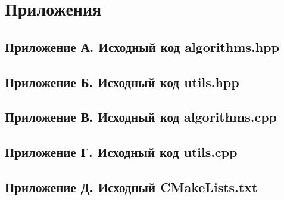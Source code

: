 \newpage

\section*{Приложения}

\subsection*{Приложение А. Исходный код algorithms.hpp}


\subsection*{Приложение Б. Исходный код utils.hpp}


\subsection*{Приложение В. Исходный код algorithms.cpp}


\subsection*{Приложение Г. Исходный код utils.cpp}


\subsection*{Приложение Д. Исходный CMakeLists.txt}


\clearpage